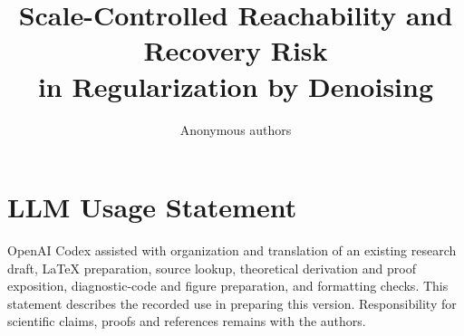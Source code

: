 \documentclass[10pt,twocolumn,letterpaper]{article}
\title{Scale-Controlled Reachability and Recovery Risk\\in Regularization by Denoising}
\author{Anonymous authors}
\begin{document}
\maketitle











\clearpage
\section*{LLM Usage Statement}
OpenAI Codex assisted with organization and translation of an existing research draft, LaTeX preparation, source lookup, theoretical derivation and proof exposition, diagnostic-code and figure preparation, and formatting checks. This statement describes the recorded use in preparing this version. Responsibility for scientific claims, proofs and references remains with the authors.
{\small}
\end{document}
